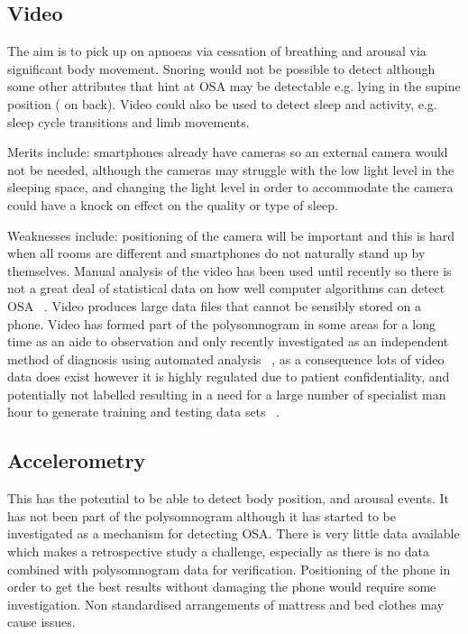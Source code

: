 \subsection{Video}
The aim is to pick up on apnoeas via cessation of breathing and arousal via significant body movement. Snoring would not be possible to detect although some other attributes that hint at OSA may be detectable e.g. lying in the supine position ( on back). Video could also be used to detect sleep and activity, e.g. sleep cycle transitions and limb movements. 

Merits include: smartphones already have cameras so an external camera would not be needed, although the cameras may struggle with the low light level in the sleeping space, and changing the light level in order to accommodate the camera could have a knock on effect on the quality or type of sleep. 

Weaknesses include: positioning of the camera will be important and this is hard when all rooms are different and smartphones do not naturally stand up by themselves. Manual analysis of the video has been used until recently so there is not a great deal of statistical data on how well computer algorithms can detect OSA ~\cite{roebuck2014review}. Video produces large data files that cannot be sensibly stored on a phone. Video has formed part of the polysomnogram in some areas for a long time as an aide to observation and only recently investigated as an independent method of diagnosis using automated analysis ~\cite{nhschoicesdiagnosis}, as a consequence lots of video data does exist however it is highly regulated due to patient confidentiality, and potentially not labelled resulting in a need for a large number of specialist man hour to generate training and testing data sets ~\cite{confidentialitynhs}.

\subsection{Accelerometry}
This has the potential to be able to detect body position, and arousal events. It has not been part of the polysomnogram although it has started to be investigated as a mechanism for detecting OSA. There is very little data available which makes a retrospective study a challenge, especially as there is no data combined with polysomnogram data for verification. Positioning of the phone in order to get the best results without damaging the phone would require some investigation. Non standardised arrangements of mattress and bed clothes may cause issues. 

